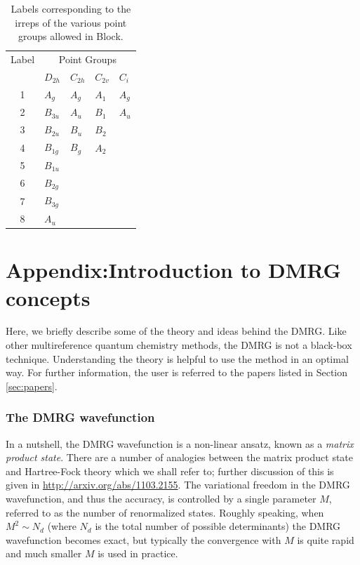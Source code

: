\documentclass[letterpaper,12pt,aps, pra]{revtex4-1}
\begin{document}
\begin{table}
	\label{tab:irrep} 
	\begin{center} 
		\caption{Labels corresponding to the irreps of the various
		point groups allowed in Block.}
	\begin{tabular}{cllll} 
		\hline \hline 
		Label & \multicolumn{4}{c}{Point Groups}\\ 
		      &$D_{2h}$&$C_{2h}$&$C_{2v}$&$C_i$\\ 
		\hline
	1&$A_g$&$A_g$&$A_1$&$A_g$\\ 
	2&$B_{3u}$&$A_u$&$B_1$&$A_u$\\
	3&$B_{2u}$&$B_u$&$B_2$&\\ 
	4&$B_{1g}$&$B_g$&$A_2$&\\ 
	5&$B_{1u}$&&&\\
	6&$B_{2g}$&&&\\ 
	7&$B_{3g}$&&&\\ 
	8&$A_u$&&&\\ 
	\hline \hline
\end{tabular} 
\end{center} 
\end{table} 

\newpage

\section{Appendix:Introduction to DMRG concepts}\label{sec:appendix1}

Here, we briefly describe some of the theory and ideas behind the DMRG. 
Like other multireference quantum chemistry methods, the DMRG
is not a black-box technique. Understanding the theory is helpful
to use the method in an optimal way. For further information, the
 user is referred to the papers listed in Section \ref{sec:papers}.

\subsubsection{The DMRG wavefunction}

In a nutshell, the DMRG wavefunction is a non-linear ansatz, known as a {\it
matrix product state}.  There are a number of analogies between the matrix
product state and Hartree-Fock theory which we shall refer to; further
discussion of this is given in \url{http://arxiv.org/abs/1103.2155}.  The
variational freedom in the DMRG wavefunction, and thus the accuracy, is
controlled by a single parameter $M$, referred to as the number of renormalized
states.  Roughly speaking, when $M^2 \sim N_d$ (where $N_d$ is the total number
of possible determinants) the DMRG wavefunction becomes exact, but typically
the convergence with $M$ is quite rapid and much smaller $M$ is used in
practice. 
\end{document}
